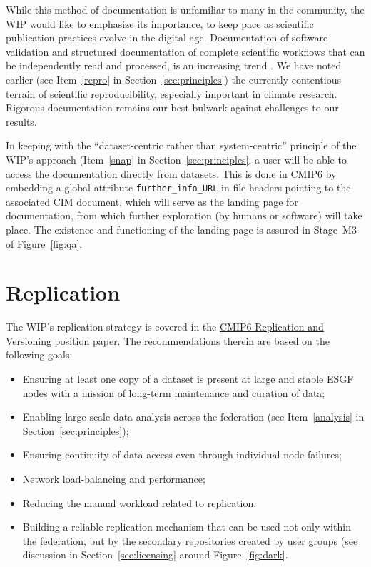 \documentclass[gmd,manuscript]{copernicus}
\newcommand{\figref}[1] {\mbox{Figure   \ref{fig:#1}}}
\newcommand{\secref}[1] {\mbox{Section  \ref{sec:#1}}}
\begin{document}
While this method of documentation is unfamiliar to many in the
community, the WIP would like to emphasize its importance, to keep
pace as scientific publication practices evolve in the digital age.
Documentation of software validation \citep[see e.g][]{ref:peng2011}
and structured documentation of complete scientific workflows that can
be independently read and processed, is an increasing trend \citep[see
the special issue on the ``Geoscience Paper of the Future'',
][]{ref:davidetal2016}. We have noted earlier (see Item~\ref{repro} in
\secref{principles}) the currently contentious terrain of scientific
reproducibility, especially important in climate research. Rigorous
documentation remains our best bulwark against challenges to our results.

In keeping with the ``dataset-centric rather than system-centric''
principle of the WIP's approach (Item~\ref{snap} in
\secref{principles}, a user will be able to access the documentation
directly from datasets. This is done in CMIP6 by embedding a global
attribute \texttt{further\_info\_URL} in file headers pointing to the
associated CIM document, which will serve as the landing page for
documentation, from which further exploration (by humans or software)
will take place. The existence and functioning of the landing page is
assured in Stage~M3 of \figref{qa}.

\section{Replication}
\label{sec:replica}

The WIP's replication strategy is covered in the
\href{https://goo.gl/jqWjQ5}{CMIP6 Replication and Versioning}
position paper. The recommendations therein are based on the following
goals:

\begin{itemize}
\item Ensuring at least one copy of a dataset is present at large and
  stable ESGF nodes with a mission of long-term maintenance and
  curation of data;
\item Enabling large-scale data analysis across the federation (see
  Item~\ref{analysis} in \secref{principles});
\item Ensuring continuity of data access even through individual node
  failures;
\item Network load-balancing and performance;
\item Reducing the manual workload related to replication.
\item Building a reliable replication mechanism that can be used not
  only within the federation, but by the secondary repositories
  created by user groups (see discussion in \secref{licensing} around
  \figref{dark}.
\end{itemize}
\end{document}
